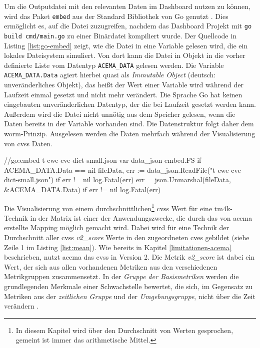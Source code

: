 \par Um die Outputdatei mit den relevanten Daten im Dashboard nutzen zu können, wird das Paket \verb|embed| aus der Standard Bibliothek von Go genutzt \autocite{EmbedPackageEmbed}. Dies ermöglicht es, auf die Datei zuzugreifen, nachdem das Dashboard Projekt mit \verb|go build cmd/main.go| zu einer Binärdatei kompiliert wurde. Der Quellcode in Listing \ref{list:go-embed} zeigt, wie die Datei in eine Variable gelesen wird, die ein lokales Dateisystem simuliert. Von dort kann die Datei in Objekt in die vorher definierte Liste vom Datentyp \verb|ACEMA_DATA| gelesen werden. Die Variable \verb|ACEMA_DATA.Data| agiert hierbei quasi als \textit{Immutable Object} (deutsch: unveränderliches Objekt), das heißt der Wert einer Variable wird während der Laufzeit einmal gesetzt und nicht mehr verändert. Die Sprache Go hat keinen eingebauten unveränderlichen Datentyp, der die bei Laufzeit gesetzt werden kann. Außerdem wird die Datei nicht unnötig aus dem Speicher gelesen, wenn die Daten bereits in der Variable vorhanden sind. Die Datenstruktur folgt daher dem \gls{worm}-Prinzip. Ausgelesen werden die Daten mehrfach während der Visualisierung von \gls{cvss} Daten.

\begin{code}[caption=Datei in Binardatei einbetten und in Struktur überführen, label={list:go-embed}]
    //go:embed t-cwe-cve-dict-small.json
    var data_json embed.FS
    if ACEMA_DATA.Data == nil {
        fileData, err := data_json.ReadFile("t-cwe-cve-dict-small.json")
        if err != nil {
                log.Fatal(err)
            }
        err = json.Unmarshal(fileData, &ACEMA_DATA.Data)
        if err != nil {
                log.Fatal(err)
            }
    }
\end{code}


Die Visualisierung von einem durchschnittlichen\footnote{In diesem Kapitel wird über den Durchschnitt von Werten gesprochen, gemeint ist immer das arithmetische Mittel.} \gls{cvss} Wert für eine \gls{tm4k}-Technik in der Matrix ist einer der Anwendungszwecke, die durch das von \gls{acema} erstellte Mapping möglich gemacht wird. Dabei wird für eine Technik der Durchschnitt aller \gls{cvss} \textit{v2\_score} Werte in den zugeordneten \glspl{cve} gebildet (siehe Zeile 1 im Listing \ref{list:mean}). Wie bereits in Kapitel \ref{limitationen-acema} beschrieben, nutzt \gls{acema} das \gls{cvss} in Version 2. Die Metrik \textit{v2\_score} ist dabei ein Wert, der sich aus allen vorhandenen Metriken aus den verschiedenen Metrikgruppen zusammensetzt. In der \textit{Gruppe der Basismetriken} werden die grundlegenden Merkmale einer Schwachstelle bewertet, die sich, im Gegensatz zu Metriken aus der \textit{zeitlichen Gruppe} und der \textit{Umgebungsgruppe}, nicht über die Zeit verändern \autocite{CVSSV2Complete}.

